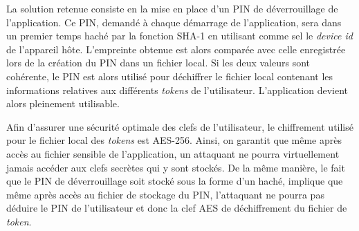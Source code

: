 La solution retenue consiste en la mise en place d'un PIN de déverrouillage de l'application.
Ce PIN, demandé à chaque démarrage de l'application, sera dans un premier temps haché par la
fonction SHA-1 en utilisant comme sel le \emph{device id} de l'appareil hôte. L'empreinte
obtenue est alors comparée avec celle enregistrée lors de la création du PIN dans un fichier
local. Si les deux valeurs sont cohérente, le PIN est alors utilisé pour déchiffrer le
fichier local contenant les informations relatives aux différents \emph{tokens} de
l'utilisateur. L'application devient alors pleinement utilisable.

Afin d'assurer une sécurité optimale des clefs de l'utilisateur, le chiffrement utilisé pour
le fichier local des \emph{tokens} est AES-256. Ainsi, on garantit que même après accès au
fichier sensible de l'application, un attaquant ne pourra virtuellement jamais accéder aux
clefs secrètes qui y sont stockés. De la même manière, le fait que le PIN de déverrouillage
soit stocké sous la forme d'un haché, implique que même après accès au fichier de stockage du
PIN, l'attaquant ne pourra pas déduire le PIN de l'utilisateur et donc la clef AES de
déchiffrement du fichier de \emph{token}.




